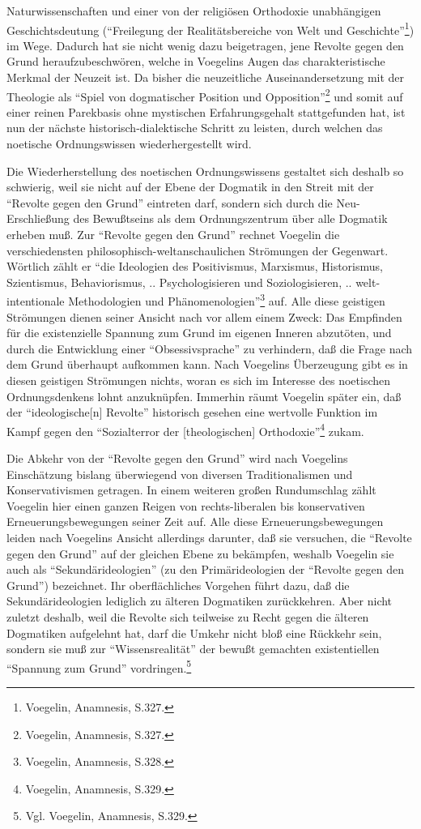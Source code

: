 Naturwissenschaften und einer von der religiösen Orthodoxie unabhängigen
Geschichtsdeutung ("`Freilegung der Realitätsbereiche von Welt und
Geschichte"'\footnote{Voegelin, Anamnesis, S.327.}) im Wege. Dadurch hat sie
nicht wenig dazu beigetragen, jene Revolte gegen den Grund heraufzubeschwören,
welche in Voegelins Augen das charakteristische Merkmal der Neuzeit ist. Da
bisher die neuzeitliche Auseinandersetzung mit der Theologie als "`Spiel von
dogmatischer Position und Opposition"'\footnote{Voegelin, Anamnesis, S.327.}
und somit auf einer reinen Parekbasis ohne mystischen Erfahrungsgehalt
stattgefunden hat, ist nun der nächste historisch-dialektische Schritt zu
leisten, durch welchen das noetische Ordnungswissen wiederhergestellt wird.

Die Wiederherstellung des noetischen Ordnungswissens gestaltet sich
deshalb so schwierig, weil sie nicht auf der Ebene der Dogmatik in den
Streit mit der "`Revolte gegen den Grund"' eintreten darf, sondern sich
durch die Neu-Erschließung des Bewußtseins als dem Ordnungszentrum über
alle Dogmatik erheben muß. Zur "`Revolte gegen den Grund"' rechnet
Voegelin die verschiedensten philosophisch-weltanschaulichen Strömungen
der Gegenwart. Wörtlich zählt er "`die Ideologien des Positivismus,
Marxismus, Historismus, Szientismus, Behaviorismus, ..  Psychologisieren
und Soziologisieren, .. welt-intentionale Methodologien und
Phänomenologien"'\footnote{Voegelin, Anamnesis, S.328.} auf.  Alle diese
geistigen Strömungen dienen seiner Ansicht nach vor allem einem Zweck:
Das Empfinden für die existenzielle Spannung zum Grund im eigenen
Inneren abzutöten, und durch die Entwicklung einer "`Obsessivsprache"'
zu verhindern, daß die Frage nach dem Grund überhaupt aufkommen kann.
Nach Voegelins Überzeugung gibt es in diesen geistigen Strömungen
nichts, woran es sich im Interesse des noetischen Ordnungsdenkens lohnt
anzuknüpfen. Immerhin räumt Voegelin später ein, daß der
"`ideologische[n] Revolte"' historisch gesehen eine wertvolle Funktion
im Kampf gegen den "`Sozialterror der [theologischen]
Orthodoxie"'\footnote{Voegelin, Anamnesis, S.329.} zukam.

Die Abkehr von der "`Revolte gegen den Grund"' wird nach Voegelins
Einschätzung bislang überwiegend von diversen Traditionalismen und
Konservativismen getragen. In einem weiteren großen Rundumschlag zählt
Voegelin hier einen ganzen Reigen von rechts-liberalen bis konservativen
Erneuerungsbewegungen seiner Zeit auf. Alle diese Erneuerungsbewegungen leiden
nach Voegelins Ansicht allerdings darunter, daß sie versuchen, die "`Revolte
gegen den Grund"' auf der gleichen Ebene zu bekämpfen, weshalb Voegelin sie
auch als "`Sekundärideologien"' (zu den Primärideologien der "`Revolte gegen
den Grund"') bezeichnet. Ihr oberflächliches Vorgehen führt dazu, daß die
Sekundärideologien lediglich zu älteren Dogmatiken zurückkehren. Aber nicht
zuletzt deshalb, weil die Revolte sich teilweise zu Recht gegen die älteren
Dogmatiken aufgelehnt hat, darf die Umkehr nicht bloß eine Rückkehr sein,
sondern sie muß zur "`Wissensrealität"' der bewußt gemachten existentiellen
"`Spannung zum Grund"' vordringen.\footnote{Vgl. Voegelin, Anamnesis, S.329.}


